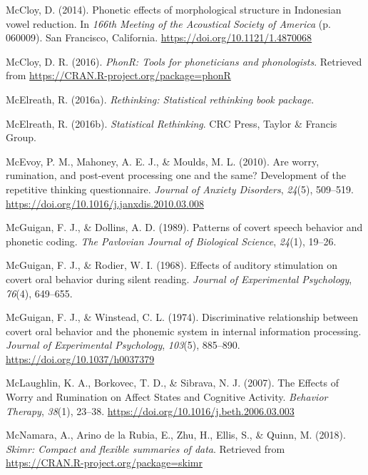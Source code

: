 \documentclass[a4paper,12pt,twoside,openright,oldfontcommands]{memoir}
\begin{document}
\leavevmode\hypertarget{ref-mccloy_phonetic_2014}{}%
McCloy, D. (2014). Phonetic effects of morphological structure in Indonesian vowel reduction. In \emph{166th Meeting of the Acoustical Society of America} (p. 060009). San Francisco, California. \url{https://doi.org/10.1121/1.4870068}

\leavevmode\hypertarget{ref-R-phonR}{}%
McCloy, D. R. (2016). \emph{PhonR: Tools for phoneticians and phonologists}. Retrieved from \url{https://CRAN.R-project.org/package=phonR}

\leavevmode\hypertarget{ref-R-rethinking}{}%
McElreath, R. (2016a). \emph{Rethinking: Statistical rethinking book package}.

\leavevmode\hypertarget{ref-mcelreath_statistical_2016}{}%
McElreath, R. (2016b). \emph{Statistical Rethinking}. CRC Press, Taylor \& Francis Group.

\leavevmode\hypertarget{ref-McEvoy2010}{}%
McEvoy, P. M., Mahoney, A. E. J., \& Moulds, M. L. (2010). Are worry, rumination, and post-event processing one and the same? Development of the repetitive thinking questionnaire. \emph{Journal of Anxiety Disorders}, \emph{24}(5), 509--519. \url{https://doi.org/10.1016/j.janxdis.2010.03.008}

\leavevmode\hypertarget{ref-mcguigan_patterns_1989}{}%
McGuigan, F. J., \& Dollins, A. D. (1989). Patterns of covert speech behavior and phonetic coding. \emph{The Pavlovian Journal of Biological Science}, \emph{24}(1), 19--26.

\leavevmode\hypertarget{ref-mcguigan_effects_1968}{}%
McGuigan, F. J., \& Rodier, W. I. (1968). Effects of auditory stimulation on covert oral behavior during silent reading. \emph{Journal of Experimental Psychology}, \emph{76}(4), 649--655.

\leavevmode\hypertarget{ref-mcguigan_discriminative_1974}{}%
McGuigan, F. J., \& Winstead, C. L. (1974). Discriminative relationship between covert oral behavior and the phonemic system in internal information processing. \emph{Journal of Experimental Psychology}, \emph{103}(5), 885--890. \url{https://doi.org/10.1037/h0037379}

\leavevmode\hypertarget{ref-mclaughlin_effects_2007}{}%
McLaughlin, K. A., Borkovec, T. D., \& Sibrava, N. J. (2007). The Effects of Worry and Rumination on Affect States and Cognitive Activity. \emph{Behavior Therapy}, \emph{38}(1), 23--38. \url{https://doi.org/10.1016/j.beth.2006.03.003}

\leavevmode\hypertarget{ref-R-skimr}{}%
McNamara, A., Arino de la Rubia, E., Zhu, H., Ellis, S., \& Quinn, M. (2018). \emph{Skimr: Compact and flexible summaries of data}. Retrieved from \url{https://CRAN.R-project.org/package=skimr}
\end{document}
